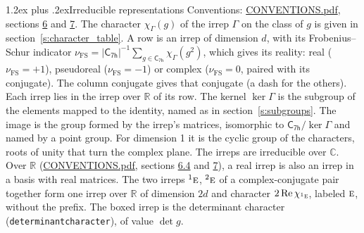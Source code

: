 \documentclass[10pt,a4paper]{article}
\makeatletter
\renewcommand\section{\@startsection{section}{1}{\z@}{-3ex plus -1ex minus -.2ex}%
  {1.2ex plus .2ex}{\normalfont\large\sffamily\bfseries\color{parttitle}}}
\numberwithin{equation}{section}
\newcommand{\grp}[1]{\mathsf{#1}}
\newcommand{\irr}[1]{\text{\normalfont\scshape #1}}
\newcommand{\conjpair}[1]{{}^{#1}}
\newcommand{\irchar}[1]{\chi_{#1}}
\newcommand{\fsind}{\nu_{\mathrm{FS}}}
\makeatother
\begin{document}
\section{Irreducible representations}\label{s:irreps}
Conventions: \href{../../CONVENTIONS.pdf}{CONVENTIONS.pdf}, sections \href{../../CONVENTIONS.pdf\#conv.6}{6} and \href{../../CONVENTIONS.pdf\#conv.7}{7}.
\leavevmode\label{n:function.character}\label{n:irrep.Gamma}The character $\irchar{\Gamma}(g)$ of the irrep $\Gamma$ on the class of $g$ is given in section~\ref{s:character_table}.
\leavevmode\label{n:index.dimension}\label{n:index.frobenius}\label{n:head.irrep}\label{n:head.reality}A row is an irrep of dimension $d$, with its Frobenius--Schur indicator $\fsind = |\grp{C_{7h}}|^{-1}\allowbreak\sum_{g\in\grp{C_{7h}}}\irchar{\Gamma}(g^2)$, which gives its reality: real ($\fsind = +1$), pseudoreal ($\fsind = -1$) or complex ($\fsind = 0$, paired with its conjugate). \label{n:head.conjugate}The column conjugate gives that conjugate (a dash for the others). \label{n:head.over.real}Each irrep lies in the irrep over $\mathbb{R}$ of its row. \label{n:head.kernel}The kernel $\ker\Gamma$ is the subgroup of the elements mapped to the identity, named as in section~\ref{s:subgroups}. \label{n:head.image}The image is the group formed by the irrep's matrices, isomorphic to $\grp{C_{7h}}/\ker\Gamma$ and named by a point group. For dimension 1 it is the cyclic group of the characters, roots of unity that turn the complex plane. The irreps are irreducible over $\mathbb{C}$. Over $\mathbb{R}$ (\href{../../CONVENTIONS.pdf}{CONVENTIONS.pdf}, sections \href{../../CONVENTIONS.pdf\#conv.6.4}{6.4} and \href{../../CONVENTIONS.pdf\#conv.7}{7}), a real irrep is also an irrep in a basis with real matrices. The two irreps $\conjpair{1}\irr{e}$, $\conjpair{2}\irr{e}$ of a complex-conjugate pair together form one irrep over $\mathbb{R}$ of dimension $2d$ and character $2\operatorname{Re}\irchar{\conjpair{1}\irr{e}}$, labeled $\irr{e}$, without the prefix. \label{n:mark.determinant}The boxed irrep is the determinant character (\texttt{determinantcharacter}), of value $\det g$.
\setlength{\emergencystretch}{2em}\par\setlength{\emergencystretch}{0pt}
\end{document}
